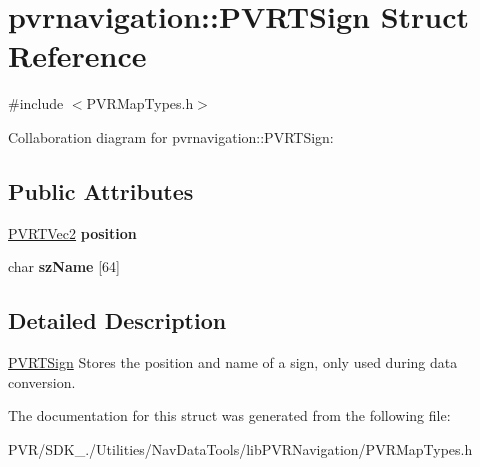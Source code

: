 \hypertarget{structpvrnavigation_1_1_p_v_r_t_sign}{\section{pvrnavigation\+:\+:P\+V\+R\+T\+Sign Struct Reference}
\label{structpvrnavigation_1_1_p_v_r_t_sign}
}


{\ttfamily \#include $<$P\+V\+R\+Map\+Types.\+h$>$}



Collaboration diagram for pvrnavigation\+:\+:P\+V\+R\+T\+Sign\+:
\subsection*{Public Attributes}
\begin{DoxyCompactItemize}
\item 
\hypertarget{structpvrnavigation_1_1_p_v_r_t_sign_a43e6aa4a0461437b8e0fe892c0743089}{\hyperlink{struct_p_v_r_t_vec2}{P\+V\+R\+T\+Vec2} {\bfseries position}}\label{structpvrnavigation_1_1_p_v_r_t_sign_a43e6aa4a0461437b8e0fe892c0743089}

\item 
\hypertarget{structpvrnavigation_1_1_p_v_r_t_sign_a8ceac49a71eb0a5d97d57bcc6b547ece}{char {\bfseries sz\+Name} \mbox{[}64\mbox{]}}\label{structpvrnavigation_1_1_p_v_r_t_sign_a8ceac49a71eb0a5d97d57bcc6b547ece}

\end{DoxyCompactItemize}


\subsection{Detailed Description}


  \hyperlink{structpvrnavigation_1_1_p_v_r_t_sign}{P\+V\+R\+T\+Sign}  Stores the position and name of a sign, only used during data conversion. 

The documentation for this struct was generated from the following file\+:\begin{DoxyCompactItemize}
\item 
P\+V\+R/\+S\+D\+K\+\_./\+Utilities/\+Nav\+Data\+Tools/lib\+P\+V\+R\+Navigation/P\+V\+R\+Map\+Types.\+h\end{DoxyCompactItemize}
